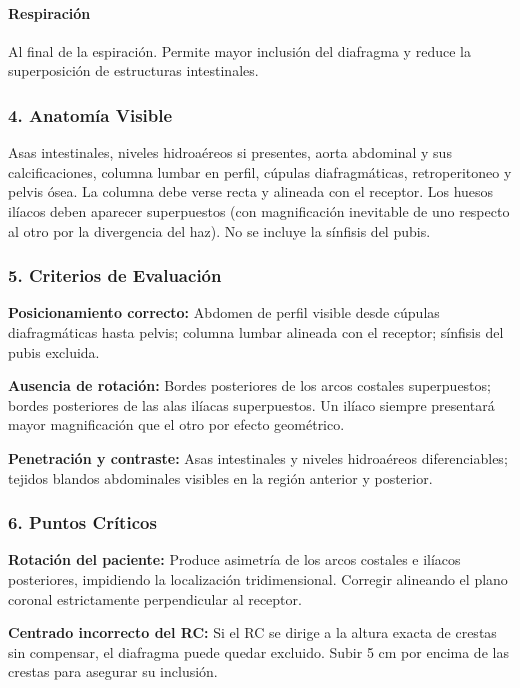 	\paragraph{Respiración}
	Al final de la espiración. Permite mayor inclusión del diafragma y reduce la superposición de estructuras intestinales.
	
	\subsubsection*{4. Anatomía Visible}
	
	Asas intestinales, niveles hidroaéreos si presentes, aorta abdominal y sus calcificaciones, columna lumbar en perfil, cúpulas diafragmáticas, retroperitoneo y pelvis ósea. La columna debe verse recta y alineada con el receptor. Los huesos ilíacos deben aparecer superpuestos (con magnificación inevitable de uno respecto al otro por la divergencia del haz). No se incluye la sínfisis del pubis.
	
	\subsubsection*{5. Criterios de Evaluación}
	
	\textbf{Posicionamiento correcto:} Abdomen de perfil visible desde cúpulas diafragmáticas hasta pelvis; columna lumbar alineada con el receptor; sínfisis del pubis excluida.
	
	\textbf{Ausencia de rotación:} Bordes posteriores de los arcos costales superpuestos; bordes posteriores de las alas ilíacas superpuestos. Un ilíaco siempre presentará mayor magnificación que el otro por efecto geométrico.
	
	\textbf{Penetración y contraste:} Asas intestinales y niveles hidroaéreos diferenciables; tejidos blandos abdominales visibles en la región anterior y posterior.
	
	\subsubsection*{6. Puntos Críticos}
	
	\textbf{Rotación del paciente:} Produce asimetría de los arcos costales e ilíacos posteriores, impidiendo la localización tridimensional. Corregir alineando el plano coronal estrictamente perpendicular al receptor.
	
	\textbf{Centrado incorrecto del RC:} Si el RC se dirige a la altura exacta de crestas sin compensar, el diafragma puede quedar excluido. Subir 5 cm por encima de las crestas para asegurar su inclusión.
	
